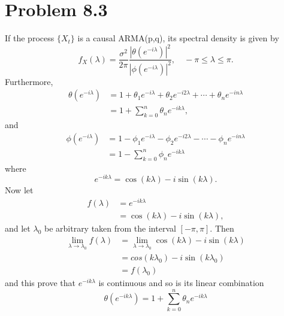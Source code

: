 \documentclass[11pt, oneside]{article}   	%
\begin{document}
\section{Problem 8.3}
If the process $\{X_{t} \}$ is a causal ARMA(p,q), its spectral density is given by \cite{petter}
\begin{equation}
f_{X}(\lambda) = \frac{\sigma^{2}}{2\pi}\frac{| \theta(e^{-i\lambda}) |^{2}}{| \phi(e^{-i\lambda}) |^{2}}, \quad -\pi \leq \lambda \leq \pi.
\end{equation}
Furthermore, 
\begin{equation}
\begin{split}
 \theta(e^{-i\lambda})  &= 1+\theta_{1}e^{-i\lambda} + \theta_{2}e^{-i2\lambda} + \cdots +\theta_{n}e^{-in\lambda}\\
 			          &=1+\sum_{k=0}^{n}\theta_{n}e^{-ik\lambda},
  \end{split}
\end{equation}
and 
\begin{equation}
\begin{split}
 \phi(e^{-i\lambda})  &= 1-\phi_{1}e^{-i\lambda} - \phi_{2}e^{-i2\lambda} - \cdots -\phi_{n}e^{-in\lambda}\\
                                &=1-\sum_{k=0}^{n}\phi_{n}e^{-ik\lambda}
 \end{split}
\end{equation}
where 
\begin{equation}
e^{-ik\lambda} = \cos(k\lambda) - i\sin(k\lambda).
\end{equation}
Now let 
\begin{equation}
\begin{split}
f(\lambda)  &= e^{-ik\lambda} \\
                  &= \cos(k\lambda) - i\sin(k\lambda),
 \end{split}
\end{equation}
and let $\lambda_{0}$ be arbitrary taken from the interval $[-\pi, \pi]$. Then 
\begin{equation}
\begin{split}
\lim_{\lambda\to\lambda_{0}}f(\lambda) &= \lim_{\lambda\to\lambda_{0}}\cos(k\lambda) - i\sin(k\lambda)\\
&=cos(k\lambda_{0}) - i\sin(k\lambda_{0})\\
&=f(\lambda_{0})
\end{split}
\end{equation}
and this prove that $e^{-ik\lambda}$ is continuous and so is its linear combination
\begin{equation}
\theta(e^{-ik\lambda}) = 1+\sum_{k=0}^{n}\theta_{n}e^{-ik\lambda}  \nonumber
\end{equation}
\end{document}
